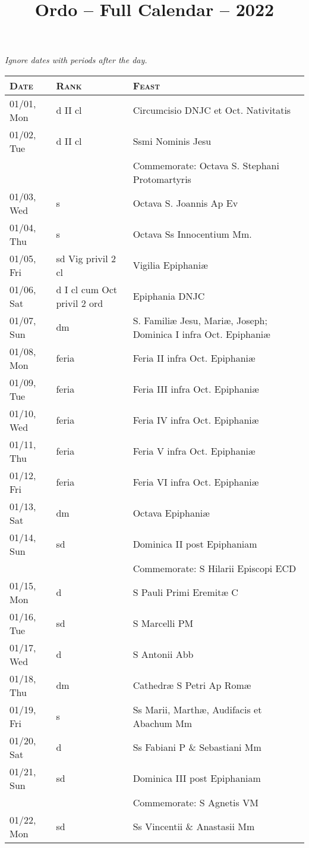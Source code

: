 \documentclass{article}
\title{Ordo -- Full Calendar -- 2022}
\begin{document}
\textit{\centering\footnotesize Ignore dates with periods after the day.}
\begin{longtable}{ l l l }
\hline
\textsc{Date} & \textsc{Rank} & \textsc{Feast} \\
\hline
\endhead
01/01, Mon & d II cl & Circumcisio DNJC et Oct. Nativitatis\\
01/02, Tue & d II cl & Ssmi Nominis Jesu\\
 & & Commemorate: Octava S. Stephani Protomartyris\\
01/03, Wed & s & Octava S. Joannis Ap Ev\\
01/04, Thu & s & Octava Ss Innocentium Mm.\\
01/05, Fri & sd Vig privil 2 cl & Vigilia Epiphaniæ\\
01/06, Sat & d I cl cum Oct privil 2 ord & Epiphania DNJC\\
01/07, Sun & dm & S. Familiæ Jesu, Mariæ, Joseph; Dominica I infra Oct. Epiphaniæ\\
01/08, Mon & feria & Feria II infra Oct. Epiphaniæ\\
01/09, Tue & feria & Feria III infra Oct. Epiphaniæ\\
01/10, Wed & feria & Feria IV infra Oct. Epiphaniæ\\
01/11, Thu & feria & Feria V infra Oct. Epiphaniæ\\
01/12, Fri & feria & Feria VI infra Oct. Epiphaniæ\\
01/13, Sat & dm & Octava Epiphaniæ\\
01/14, Sun & sd & Dominica II post Epiphaniam\\
 & & Commemorate: S Hilarii Episcopi ECD\\
01/15, Mon & d & S Pauli Primi Eremitæ C\\
01/16, Tue & sd & S Marcelli PM\\
01/17, Wed & d & S Antonii Abb\\
01/18, Thu & dm & Cathedræ S Petri Ap Romæ\\
01/19, Fri & s & Ss Marii, Marthæ, Audifacis et Abachum Mm\\
01/20, Sat & d & Ss Fabiani P \& Sebastiani Mm\\
01/21, Sun & sd & Dominica III post Epiphaniam\\
 & & Commemorate: S Agnetis VM\\
01/22, Mon & sd & Ss Vincentii \& Anastasii Mm\\

\end{longtable}
\end{document}
